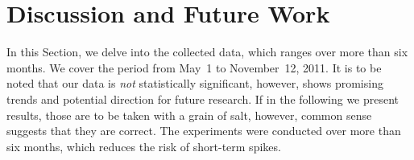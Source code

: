\documentclass{iosart2c}
\begin{document}
\begin{table}
  \centering
  \qquad
  \caption{\hspace{-2.5em}}
  \label{tab:toplocations}
\end{table}

\section{Discussion and Future Work}
In this Section, we delve into the collected data, which ranges over more than six months.
We cover the period from May~1 to November~12, 2011.
It is to be noted that our data is \emph{not} statistically significant, however, shows promising trends and potential direction for future research.
If in the following we present results, those are to be taken with a grain of salt, however, common sense suggests that they are correct. The experiments were conducted over more than six months, which reduces the risk of short-term spikes.
\end{document}
